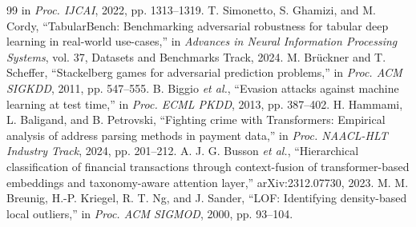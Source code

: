 \documentclass[conference]{IEEEtran}
\begin{document}
\begin{thebibliography}{99}
in \emph{Proc. IJCAI}, 2022, pp. 1313--1319.
T. Simonetto, S. Ghamizi, and M. Cordy, ``TabularBench: Benchmarking
adversarial robustness for tabular deep learning in real-world use-cases,'' in
\emph{Advances in Neural Information Processing Systems}, vol. 37, Datasets
and Benchmarks Track, 2024.
M. Br\"uckner and T. Scheffer, ``Stackelberg games for adversarial prediction
problems,'' in \emph{Proc. ACM SIGKDD}, 2011, pp. 547--555.
B. Biggio \emph{et al.}, ``Evasion attacks against machine learning at test
time,'' in \emph{Proc. ECML PKDD}, 2013, pp. 387--402.
H. Hammami, L. Baligand, and B. Petrovski, ``Fighting crime with
Transformers: Empirical analysis of address parsing methods in payment
data,'' in \emph{Proc. NAACL-HLT Industry Track}, 2024, pp. 201--212.
A. J. G. Busson \emph{et al.}, ``Hierarchical classification of financial
transactions through context-fusion of transformer-based embeddings and
taxonomy-aware attention layer,'' arXiv:2312.07730, 2023.
M. M. Breunig, H.-P. Kriegel, R. T. Ng, and J. Sander, ``LOF: Identifying
density-based local outliers,'' in \emph{Proc. ACM SIGMOD}, 2000, pp. 93--104.
\end{thebibliography}
\end{document}
